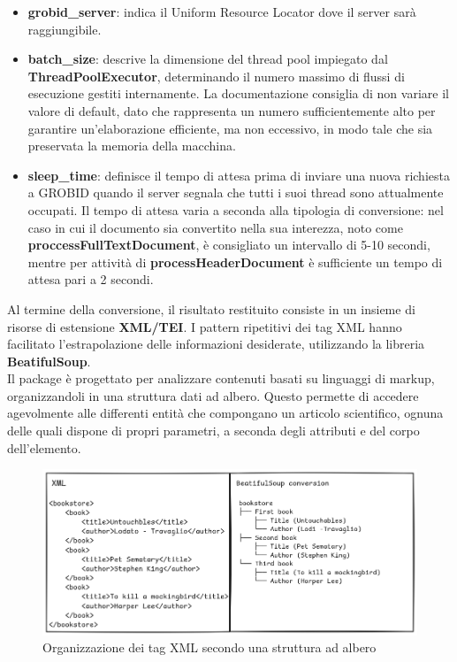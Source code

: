 \begin{itemize}
    \renewcommand{\labelitemi}{-}
    \item \textbf{grobid\_server}: indica il Uniform Resource Locator dove il server sarà raggiungibile.
    \item \textbf{batch\_size}: descrive la dimensione del thread pool impiegato dal \textbf{ThreadPoolExecutor}, determinando il numero massimo di flussi di esecuzione gestiti internamente. La documentazione consiglia di non variare il valore di default, dato che rappresenta un numero sufficientemente alto per garantire un'elaborazione efficiente, ma non eccessivo, in modo tale che sia preservata la memoria della macchina.
    \item \textbf{sleep\_time}: definisce il tempo di attesa prima di inviare una nuova richiesta a GROBID quando il server segnala che tutti i suoi thread sono attualmente occupati. Il tempo di attesa varia a seconda alla tipologia di conversione: nel caso in cui il documento sia convertito nella sua interezza, noto come \textbf{proccessFullTextDocument}, è consigliato un intervallo di 5-10 secondi, mentre per attività di \textbf{processHeaderDocument} è sufficiente un tempo di attesa pari a 2 secondi.
\end{itemize}
Al termine della conversione, il risultato restituito consiste in un insieme di risorse di estensione \textbf{XML/TEI}. I pattern ripetitivi dei tag XML hanno facilitato l'estrapolazione delle informazioni desiderate, utilizzando la libreria \textbf{BeatifulSoup}. \vspace{7pt} \\
Il package è progettato per analizzare contenuti basati su linguaggi di markup, organizzandoli in una struttura dati ad albero. Questo permette di accedere agevolmente alle differenti entità che compongano un articolo scientifico, ognuna delle quali dispone di propri parametri, a seconda degli attributi e del corpo dell'elemento.
\begin{figure}[H]
    \centering
    \includegraphics[width=.7\textwidth]{img/img4.png}
    \caption{Organizzazione dei tag XML secondo una struttura ad albero}
    \label{fig:3.2.1-3.1}
\end{figure}
